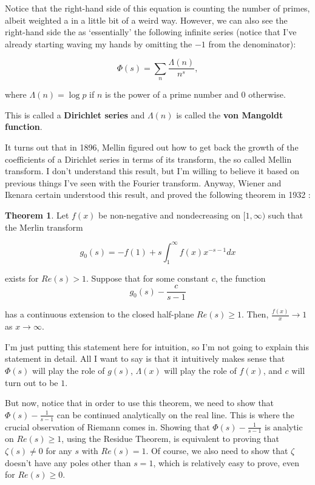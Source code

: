 \documentclass{article}
\theoremstyle{definition}
\newtheorem{theorem}{Theorem}[section]
\begin{document}
Notice that the right-hand side of this equation is counting the number of primes, albeit
weighted a in a little bit of a weird way. However, we can also see the right-hand side the as
`essentially' the following infinite series (notice that I've already starting waving my hands
by omitting the $ -1 $ from the denominator):

\[ \Phi(s) = \sum_{n} \frac{\Lambda(n)}{n^{s}}, \]

where $ \Lambda(n) = \log p $ if $ n $ is the power of a prime number and $ 0 $ otherwise.

This is called a \textbf{Dirichlet series} and $ \Lambda(n) $ is called the \textbf{von Mangoldt function}.

It turns out that in 1896, Mellin figured out how to get back the growth of the coefficients
of a Dirichlet series in terms of its transform, the so called Mellin transform. I don't understand
this result, but I'm willing to believe it based on previous things I've seen with the Fourier transform.
Anyway, Wiener and Ikenara certain understood this result, 
and proved the following theorem in 1932 \cite{korevaar_newmans_1982}:

\begin{theorem}
    Let $ f(x) $ be non-negative and nondecreasing on $ [1,\infty) $ such that the Merlin
    transform

    \[ g_{0}(s) = - f(1) + s \int_{1}^{\infty} f(x) x^{-s - 1} dx \]
    
    exists for $ Re(s) > 1 $. Suppose that for some constant $ c $, the function 
    \[ g_{0}(s) - \frac{c}{s-1} \]

    has a continuous extension to the closed half-plane $ Re(s) \geq 1 $. Then, $ \frac{f(x)}{x} \to 1 $
    as $ x \to \infty $.
\end{theorem}

I'm just putting this statement here for intuition, so I'm not going to explain this statement in detail.
All I want to say is that it intuitively makes sense that $ \Phi(s) $ will play the role of $ g(s) $,
$ \Lambda(x) $ will play the role of $ f(x) $, and $ c $ will turn out to be $ 1 $.

But now, notice that in order to use this theorem, we need to show that $ \Phi(s) - \frac{1}{s - 1} $
can be continued analytically on the real line. This is where the crucial observation of Riemann
comes in. Showing that $ \Phi(s) - \frac{1}{s - 1} $ is analytic on $ Re(s) \geq 1 $, using the Residue
Theorem, is equivalent to proving that $ \zeta(s) \neq 0 $ for any $ s $ with $ Re(s) = 1 $. Of course,
we also need to show that $ \zeta $ doesn't have any poles other than $ s = 1 $, which is relatively easy to prove,
even for $ Re(s) \geq 0 $.
\end{document}
